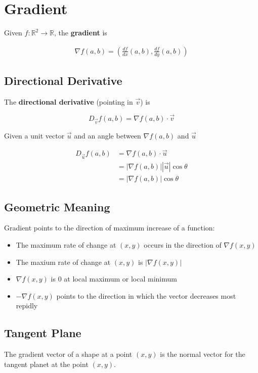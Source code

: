 \section{Gradient}

  Given $ f: \mathbb{R}^{2} \to \mathbb{R} $, the \textbf{gradient} is

  \begin{align}
    \nabla f \left( a, b \right) =
    \left(
      \frac{df}{dx} \left( a, b \right),
      \frac{df}{dy} \left( a, b \right)
    \right)
  \end{align}

  \subsection{Directional Derivative}

    The \textbf{directional derivative} (pointing in $ \vec{v} $) is

    \begin{equation}
      D_{\vec{v}} f \left( a, b \right) =
      \nabla f \left( a, b \right) \cdot \vec{v}
    \end{equation}

    Given a unit vector $ \vec{u} $ and an angle between
    $ \nabla f \left( a, b \right) $ and $ \vec{u} $

    \begin{align*}
      D_{\vec{u}} f \left( a, b \right) &=
      \nabla f \left( a, b \right) \cdot \vec{u} \\
      &= \left| \nabla f \left( a, b \right) \right|
      \left| \vec{u} \right| \cos\theta \\
      &= \left| \nabla f \left( a, b \right) \right| \cos\theta
    \end{align*}

  \subsection{Geometric Meaning}

    Gradient points to the direction of maximum increase of a function:

    \begin{itemize}
      \item The maximum rate of change at $ \left( x, y \right) $
      occurs in the direction of $ \nabla f \left( x, y \right) $
      \item The maxium rate of change at $ \left( x, y \right) $  is
      $ \left| \nabla f \left( x, y \right) \right| $
      \item $ \nabla f \left( x, y \right) $ is $ 0 $ at local maximum or
      local minimum
      \item $ - \nabla f \left( x, y \right) $ points to the direction
      in which the vector decreases most repidly
    \end{itemize}

  \subsection{Tangent Plane}

    The gradient vector of a shape at a point $ (x, y) $ is the normal
    vector for the tangent planet at the point $ (x, y) $.